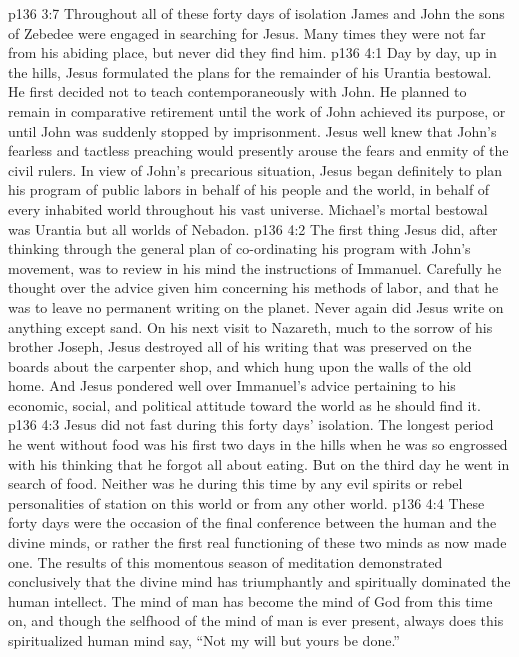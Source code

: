 \pc \vs p136 3:7 Throughout all of these forty days of isolation James and John the sons of Zebedee were engaged in searching for Jesus. Many times they were not far from his abiding place, but never did they find him.
\vs p136 4:1 Day by day, up in the hills, Jesus formulated the plans for the remainder of his Urantia bestowal. He first decided not to teach contemporaneously with John. He planned to remain in comparative retirement until the work of John achieved its purpose, or until John was suddenly stopped by imprisonment. Jesus well knew that John’s fearless and tactless preaching would presently arouse the fears and enmity of the civil rulers. In view of John’s precarious situation, Jesus began definitely to plan his program of public labors in behalf of his people and the world, in behalf of every inhabited world throughout his vast universe. Michael’s mortal bestowal was  Urantia but  all worlds of Nebadon.
\vs p136 4:2 The first thing Jesus did, after thinking through the general plan of co\hyp{}ordinating his program with John’s movement, was to review in his mind the instructions of Immanuel. Carefully he thought over the advice given him concerning his methods of labor, and that he was to leave no permanent writing on the planet. Never again did Jesus write on anything except sand. On his next visit to Nazareth, much to the sorrow of his brother Joseph, Jesus destroyed all of his writing that was preserved on the boards about the carpenter shop, and which hung upon the walls of the old home. And Jesus pondered well over Immanuel’s advice pertaining to his economic, social, and political attitude toward the world as he should find it.
\pc \vs p136 4:3 Jesus did not fast during this forty days’ isolation. The longest period he went without food was his first two days in the hills when he was so engrossed with his thinking that he forgot all about eating. But on the third day he went in search of food. Neither was he  during this time by any evil spirits or rebel personalities of station on this world or from any other world.
\pc \vs p136 4:4 These forty days were the occasion of the final conference between the human and the divine minds, or rather the first real functioning of these two minds as now made one. The results of this momentous season of meditation demonstrated conclusively that the divine mind has triumphantly and spiritually dominated the human intellect. The mind of man has become the mind of God from this time on, and though the selfhood of the mind of man is ever present, always does this spiritualized human mind say, \textcolor{ubdarkred}{“Not my will but yours be done.”}

